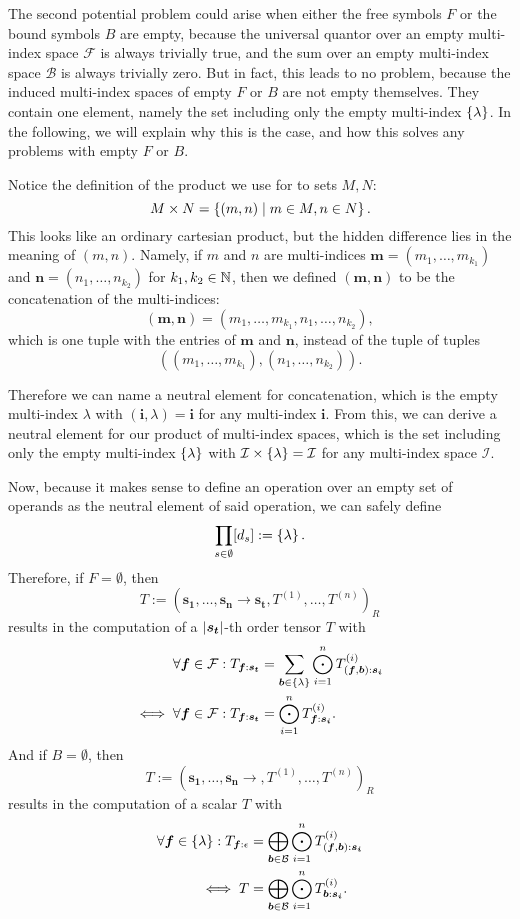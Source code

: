 The second potential problem could arise when either the free symbols $F$ or the bound symbols $B$ are empty,
because the universal quantor over an empty multi-index space $\mathcal{F}$ is always trivially true, and the sum over an empty multi-index space $\mathcal{B}$ is always trivially zero.
But in fact, this leads to no problem, because the induced multi-index spaces of empty $F$ or $B$ are not empty themselves.
They contain one element, namely the set including only the empty multi-index $\lbrace \lambda \rbrace$.
In the following, we will explain why this is the case, and how this solves any problems with empty $F$ or $B$.

Notice the definition of the product we use for to sets $M, N$:
$$M \times N = \left\lbrace (m, n) \mid m \in M, n \in N \right\rbrace.$$
This looks like an ordinary cartesian product, but the hidden difference lies in the meaning of $(m,n)$.
Namely, if $m$ and $n$ are multi-indices $\bm{m} = (m_1, \dots, m_{k_1})$ and $\bm{n} = (n_1, \dots, n_{k_2})$ for $k_1, k_2 \in \mathbb{N}$, then we defined $(\bm{m}, \bm{n})$ to be the concatenation of the multi-indices:
$$(\bm{m}, \bm{n}) = (m_1, \dots, m_{k_1}, n_1, \dots, n_{k_2}),$$
which is one tuple with the entries of $\bm{m}$ and $\bm{n}$, instead of the tuple of tuples
$$((m_1, \dots, m_{k_1}), (n_1, \dots, n_{k_2})).$$

Therefore we can name a neutral element for concatenation, which is the empty multi-index $\lambda$ with $(\bm{i}, \lambda) = \bm{i}$ for any multi-index $\bm{i}$.
From this, we can derive a neutral element for our product of multi-index spaces, which is the set including only the empty multi-index $\lbrace \lambda \rbrace$ with $\mathcal{I} \times \lbrace \lambda \rbrace = \mathcal{I}$ for any multi-index space $\mathcal{I}$.

Now, because it makes sense to define an operation over an empty set of operands as the neutral element of said operation, we can safely define
$$\prod\limits_{s \in \emptyset} [d_s] := \left\lbrace \lambda \right\rbrace.$$
Therefore, if $F = \emptyset$, then
$$T := (\bm{s_1},\dots,\bm{s_n} \rightarrow \bm{s_t}, T^{(1)},\dots,T^{(n)})_R$$
results in the computation of a $\left\lvert \bm{s_t} \right\rvert$-th order tensor $T$ with
\begin{align*}
    \forall \bm{f} \in \mathcal{F}: T_{\bm{f}: \bm{s_t}}      & = \sum\limits_{\bm{b} \in \lbrace \lambda \rbrace} \bigodot\limits_{i = 1}^{n} T^{(i)}_{(\bm{f},\bm{b}):\bm{s_i}} \\
    \iff \forall \bm{f} \in \mathcal{F}: T_{\bm{f}: \bm{s_t}} & = \bigodot\limits_{i = 1}^{n} T^{(i)}_{\bm{f}:\bm{s_i}}.
\end{align*}
And if $B = \emptyset$, then
$$T := (\bm{s_1},\dots,\bm{s_n} \rightarrow , T^{(1)},\dots,T^{(n)})_R$$
results in the computation of a scalar $T$ with
\begin{align*}
    \forall \bm{f} \in \lbrace \lambda \rbrace: T_{\bm{f}: \epsilon} & = \bigoplus\limits_{\bm{b} \in \mathcal{B}} \bigodot\limits_{i = 1}^{n} T^{(i)}_{(\bm{f},\bm{b}):\bm{s_i}} \\
    \iff T                                                      & = \bigoplus\limits_{\bm{b} \in \mathcal{B}} \bigodot\limits_{i = 1}^{n} T^{(i)}_{\bm{b}:\bm{s_i}}.
\end{align*}